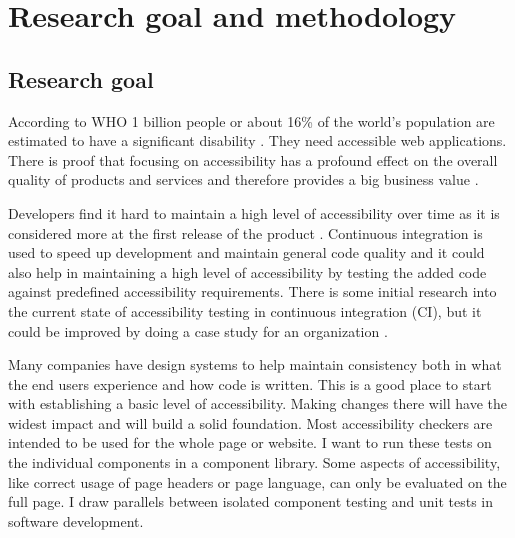 \documentclass{master_thesis}
\begin{document}
\section{Research goal and methodology}
\subsection{Research goal}


According to WHO 1 billion people or about 16\% of the world's population are estimated to have a significant disability \citep{WHO2022}. They need accessible web applications. There is proof that focusing on accessibility has a profound effect on the overall quality of products and services and therefore provides a big business value \citep{Miesenberger2020}.

Developers find it hard to maintain a high level of accessibility over time as it is considered more at the first release of the product \citep{Paterno2020}. Continuous integration is used to speed up development and maintain general code quality \citep{Zhao2017} and it could also help in maintaining a high level of accessibility by testing the added code against predefined accessibility requirements. There is some initial research into the current state of accessibility testing in continuous integration (CI), but it could be improved by doing a case study for an organization \citep{Sane2021}.


Many companies have design systems to help maintain consistency both in what the end users experience and how code is written. This is a good place to start with establishing a basic level of accessibility. Making changes there will have the widest impact and will build a solid foundation. Most accessibility checkers are intended to be used for the whole page or website. I want to run these tests on the individual components in a component library. Some aspects of accessibility, like correct usage of page headers or page language, can only be evaluated on the full page. I draw parallels between isolated component testing and unit tests in software development.
\end{document}
